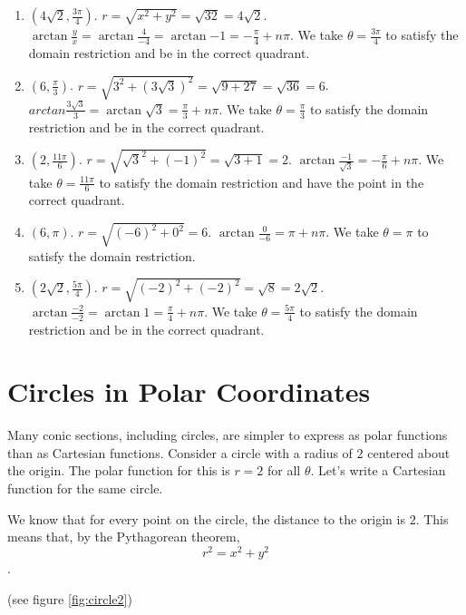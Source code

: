 \begin{Answer}[ref = convert2]
\begin{enumerate}
\item $(4\sqrt{2}, \frac{3\pi}{4})$. $r = \sqrt{x^2 + y^2} = \sqrt{32} = 4
\sqrt{2}$. $\arctan{\frac{y}{x}} = \arctan{\frac{4}{-4}} = \arctan{-1} = -
\frac{\pi}{4} + n\pi$. We take $\theta = \frac{3\pi}{4}$ to satisfy the domain 
restriction and be in the correct quadrant. 
\item $(6, \frac{\pi}{3})$. $r = \sqrt{3^2 + \left( 3\sqrt{3} \right)^2} = 
\sqrt{9 + 27} = \sqrt{36} = 6$. $arctan{\frac{3\sqrt{3}}{3}} = \arctan{\sqrt{
3}} = \frac{\pi}{3} + n\pi$. We take $\theta = \frac{\pi}{3}$ to satisfy the 
domain restriction and be in the correct quadrant. 
\item $(2,\frac{11\pi}{6})$. $r = \sqrt{\sqrt{3}^2 + (-1)^2} = \sqrt{3 + 1} = 
2$. $\arctan{\frac{-1}{\sqrt{3}}} = -\frac{\pi}{6} + n\pi$. We take $\theta = 
\frac{11\pi}{6}$ to satisfy the domain restriction and have the point in the 
correct quadrant. 
\item $(6, \pi)$. $r = \sqrt{(-6)^2 + 0^2} = 6$. $\arctan{\frac{0}{-6}} = \pi 
+ n\pi$. We take $\theta = \pi$ to satisfy the domain restriction. 
\item $(2\sqrt{2}, \frac{5\pi}{4})$. $r = \sqrt{(-2)^2 + (-2)^2} = \sqrt{8} = 
2\sqrt{2}$. $\arctan{\frac{-2}{-2}} = \arctan{1} = \frac{\pi}{4} + n\pi$. We 
take $\theta = \frac{5\pi}{4}$ to satisfy the domain restriction and be in the 
correct quadrant. 
\end{enumerate}
\end{Answer}



\section{Circles in Polar Coordinates}
Many conic sections, including circles, are simpler to express as polar 
functions than as Cartesian functions. Consider a circle with a radius of $2$ 
centered about the origin. The polar function for this is $r = 2$ for all 
$\theta$. Let's write a Cartesian function for the same circle. 

We know that for every point on the circle, the distance to the origin is $2$. 
This means that, by the Pythagorean theorem, 
$$r^2 = x^2 + y^2$$.

(see figure \ref{fig:circle2})

